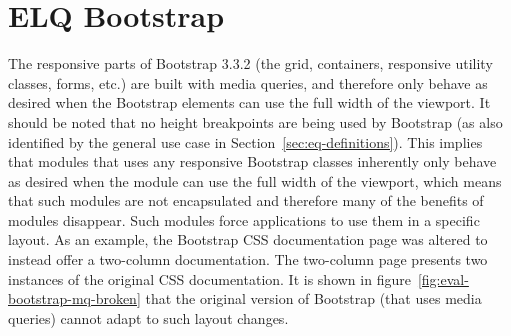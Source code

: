 \documentclass[a4paper,11pt]{kth-mag}
\begin{document}
    \section{ELQ Bootstrap}\label{sec:eval-bootstrap}
      The \gls{responsive} parts of \gls{Bootstrap} 3.3.2 (the grid, containers, \gls{responsive} utility classes, forms, etc.) are built with \gls{media queries}, and therefore only behave as desired when the \gls{Bootstrap} \glspl{element} can use the full width of the \gls{viewport}.
      It should be noted that no height breakpoints are being used by \gls{Bootstrap} (as also identified by the general use case in Section~\ref{sec:eq-definitions}).
      This implies that modules that uses any \gls{responsive} \gls{Bootstrap} classes inherently only behave as desired when the module can use the full width of the \gls{viewport}, which means that such modules are not \gls{encapsulated} and therefore many of the benefits of modules disappear.
      Such modules force applications to use them in a specific layout.
      As an example, the \gls{Bootstrap} \gls{CSS} documentation page was altered to instead offer a two-column documentation.
      The two-column page presents two instances of the original \gls{CSS} documentation.
      It is shown in figure~\ref{fig:eval-bootstrap-mq-broken} that the original version of \gls{Bootstrap} (that uses \gls{media queries}) cannot adapt to such layout changes.
\end{document}
